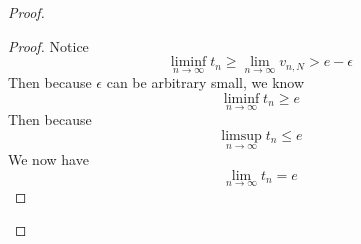 \documentclass{report}
\begin{document}
\begin{proof}
\begin{proof}
Notice 
\begin{equation}
\liminf_{n\to\infty} t_n\geq \lim_{n\to\infty}v_{n,N}>e-\epsilon 
\end{equation}
Then because $\epsilon $ can be arbitrary small, we know 
\begin{equation}
\liminf_{n\to\infty} t_n\geq e
\end{equation}
Then because 
\begin{equation}
\limsup_{n\to\infty} t_n\leq e
\end{equation}
We now have
\begin{equation}
\lim_{n\to\infty} t_n=e
\end{equation}

\end{proof}




\end{proof}
\end{document}
